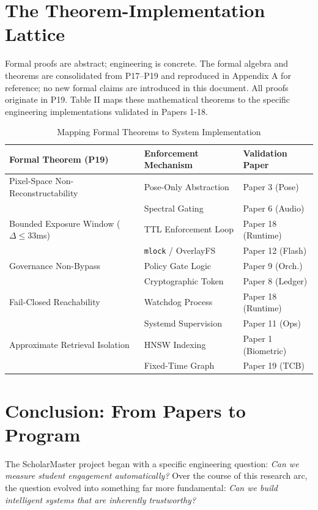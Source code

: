 \documentclass[conference]{IEEEtran}
\theoremstyle{definition}
\begin{document}
\section{The Theorem-Implementation Lattice}
Formal proofs are abstract; engineering is concrete. The formal algebra and theorems are consolidated from P17–P19 and reproduced in Appendix A for reference; no new formal claims are introduced in this document. All proofs originate in P19. Table II maps these mathematical theorems to the specific engineering implementations validated in Papers 1-18.

\begin{table}[htbp]
\caption{Mapping Formal Theorems to System Implementation}
\begin{center}
\begin{tabular}{p{2.5cm} p{2.5cm} p{2.5cm}}
\toprule
\textbf{Formal Theorem (P19)} & \textbf{Enforcement Mechanism} & \textbf{Validation Paper} \\
\midrule
Pixel-Space Non-Reconstructability & Pose-Only Abstraction & Paper 3 (Pose) \\
& Spectral Gating & Paper 6 (Audio) \\
\midrule
Bounded Exposure Window ($\Delta \le 33$ms) & TTL Enforcement Loop & Paper 18 (Runtime) \\
& \texttt{mlock} / OverlayFS & Paper 12 (Flash) \\
\midrule
Governance Non-Bypass & Policy Gate Logic & Paper 9 (Orch.) \\
& Cryptographic Token & Paper 8 (Ledger) \\
\midrule
Fail-Closed Reachability & Watchdog Process & Paper 18 (Runtime) \\
& Systemd Supervision & Paper 11 (Ops) \\
\midrule
Approximate Retrieval Isolation & HNSW Indexing & Paper 1 (Biometric) \\
& Fixed-Time Graph & Paper 19 (TCB) \\
\bottomrule
\end{tabular}
\end{center}
\end{table}

\section{Conclusion: From Papers to Program}
The ScholarMaster project began with a specific engineering question: \textit{Can we measure student engagement automatically?} Over the course of this research arc, the question evolved into something far more fundamental: \textit{Can we build intelligent systems that are inherently trustworthy?}
\end{document}
